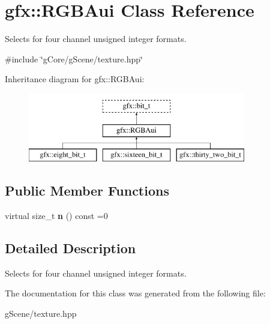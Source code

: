 \hypertarget{classgfx_1_1RGBAui}{\section{gfx\-:\-:R\-G\-B\-Aui Class Reference}
\label{classgfx_1_1RGBAui}
}


Selects for four channel unsigned integer formats.  




{\ttfamily \#include \char`\"{}g\-Core/g\-Scene/texture.\-hpp\char`\"{}}

Inheritance diagram for gfx\-:\-:R\-G\-B\-Aui\-:\begin{figure}[H]
\begin{center}
\leavevmode
\includegraphics[height=3.000000cm]{classgfx_1_1RGBAui}
\end{center}
\end{figure}
\subsection*{Public Member Functions}
\begin{DoxyCompactItemize}
\item 
\hypertarget{classgfx_1_1RGBAui_aabd6223ecdcc6b4f2b9ee1fa5b4d6b58}{virtual size\-\_\-t {\bfseries n} () const =0}\label{classgfx_1_1RGBAui_aabd6223ecdcc6b4f2b9ee1fa5b4d6b58}

\end{DoxyCompactItemize}


\subsection{Detailed Description}
Selects for four channel unsigned integer formats. 

The documentation for this class was generated from the following file\-:\begin{DoxyCompactItemize}
\item 
g\-Scene/texture.\-hpp\end{DoxyCompactItemize}
